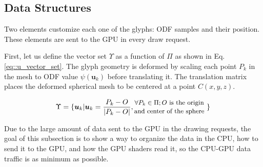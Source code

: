 \documentclass[twoside,twocolumn,10pt]{article}
\begin{document}
\subsection{Data Structures}
\label{ssec::datastruct}

Two elements customize each one of the glyphs: ODF samples and their position. These elements are sent to the GPU in every draw request.

First, let us define the vector set $\Upsilon$ as a function of $\Pi$ as shown in Eq. \ref{eq::u_vector_set}. The glyph geometry is deformed by scaling each point $P_k$ in the mesh to ODF value $\psi(\bm{u}_k)$ before translating it. The translation matrix places the deformed spherical mesh to be centered at a point $C(x, y, z)$.

\begin{equation}
\label{eq::u_vector_set}
\Upsilon = \{\bm{u}_k | \bm{u}_k = \frac{P_k - O}{|P_k - O|}, 
\begin{tabular}{@{}c@{}}
\small{$\forall P_k \in \Pi; O$ is the origin} \\
\small{and center of the sphere}

\end{tabular}
\text{ }\}
\end{equation}


Due to the large amount of data sent to the GPU in the drawing requests, the goal of this subsection is to show a way to organize the data in the CPU, how to send it to the GPU, and how the GPU shaders read it, so the CPU-GPU data traffic is as minimum as possible. %




\end{document}
